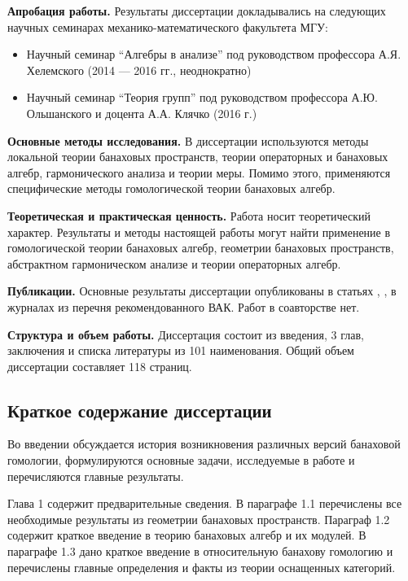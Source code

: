 \textbf{Апробация работы.} Результаты диссертации докладывались на следующих научных семинарах механико-математического факультета МГУ:

\begin{itemize}
\item Научный семинар ``Алгебры в анализе'' под руководством профессора А.Я. Хелемского  (2014 — 2016 гг., неоднократно)
\item Научный семинар ``Теория групп'' под руководством профессора А.Ю. Ольшанского и доцента А.А. Клячко (2016 г.)
\end{itemize}

\textbf{Основные методы исследования.} В диссертации используются методы локальной теории банаховых пространств, теории операторных и банаховых алгебр, гармонического анализа и теории меры. Помимо этого, применяются специфические методы гомологической теории банаховых алгебр.

\textbf{Теоретическая и практическая ценность.} Работа носит теоретический характер. Результаты и методы настоящей работы могут найти применение в гомологической теории банаховых алгебр, геометрии банаховых пространств, абстрактном гармоническом анализе и теории операторных алгебр.

\textbf{Публикации.} Основные результаты диссертации опубликованы в статьях \cite{NemMetTopProjIdBanAlg}, \cite{NemTopInjCStarAlg}, \cite{NemHomolTrivCatModLp} в журналах из перечня рекомендованного ВАК. Работ в соавторстве нет.

\textbf{Структура и объем работы.} Диссертация состоит из введения, 3 глав, заключения и списка литературы
из 101 наименования. Общий объем диссертации составляет 118 страниц.

\subsection*{\Large Краткое содержание диссертации}
Во введении обсуждается история возникновения различных версий банаховой гомологии, формулируются основные задачи, исследуемые в работе и перечисляются главные результаты.

Глава 1 содержит предварительные сведения. В параграфе 1.1 перечислены все необходимые результаты из геометрии банаховых пространств. Параграф 1.2 содержит краткое введение в теорию банаховых алгебр и их модулей. В параграфе 1.3 дано краткое введение в относительную банахову гомологию и перечислены главные определения и факты из теории оснащенных категорий.

